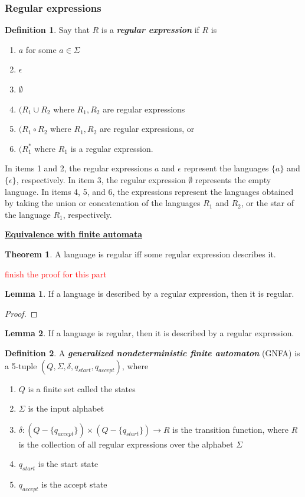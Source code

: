 \documentclass[11pt]{article}
\theoremstyle{definition}
\newtheorem{defn}{Definition}[section]
\newtheorem{thm}{Theorem}[section]
\newtheorem{lemma}{Lemma}[section]
\newcommand{\todo}{\textcolor{red}}
\begin{document}
\subsubsection{Regular expressions}
\begin{defn}
Say that $R$ is a \textbf{\textit{regular expression}} if $R$ is
\begin{enumerate}
    \item $a$ for some $a\in \Sigma$ 
    \item $\epsilon$ 
    \item $\emptyset$
    \item $(R_1\cup R_2$ where $R_1, R_2$ are regular expressions
    \item $(R_1\circ R_2$ where $R_1, R_2$ are regular expressions, or
    \item $(R_1^{*}$ where $R_1$ is a regular expression.
\end{enumerate}
In items 1 and 2, the regular expressions $a$ and $\epsilon$ represent the languages $\{a\}$ and $\{\epsilon\}$, respectively. In item 3, the regular expression $\emptyset$ represents the empty language. In items 4, 5, and 6, the expressions represent the languages obtained by taking the union or concatenation of the languages $R_1$ and $R_2$, or the star of the language $R_1$, respectively.
\end{defn}
\textbf{\underline{Equivalence with finite automata}}
\begin{thm}
A language is regular iff some regular expression describes it.
\end{thm}

\todo{finish the proof for this part }
\begin{lemma}
    If a language is described by a regular expression, then it is regular.
\end{lemma}
 
\begin{proof}

\end{proof}
\begin{lemma}
If a language is regular, then it is described by a regular expression.
\end{lemma}
\begin{defn}
A \textbf{\textit{generalized nondeterministic finite automaton}} (GNFA) is a 5-tuple $(Q,\Sigma, \delta, q_{start}, q_{accept})$, where
\begin{enumerate}
    \item $Q$ is a finite set called the states 
    \item $\Sigma$ is the input alphabet
    \item $\delta: (Q-\{q_{accept}\})\times(Q-\{q_{start}\}) \longrightarrow R$ is the transition function, where $R$ is the collection of all regular expressions over the alphabet $\Sigma$
    \item $q_{start}$ is the start state
    \item $q_{accept}$ is the accept state
\end{enumerate}
\end{defn}
\end{document}
